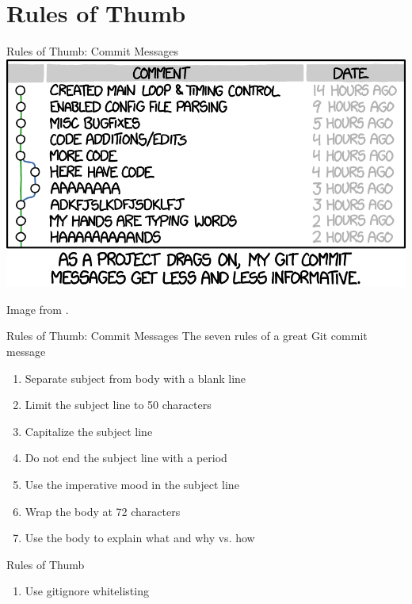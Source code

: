 \documentclass[aspectratio=169,fleqn]{beamer}
\begin{document}

\section{Rules of Thumb} %
\label{sec:rules_of_thumb}

  \begin{frame}{Rules of Thumb: Commit Messages}
    \centering
    \includegraphics[height=0.8\textheight]{images/bad-commit-messages.png}

    {\scriptsize Image from \textcite{good-commit-message}.}
  \end{frame}

  \begin{frame}{Rules of Thumb: Commit Messages}
    The seven rules of a great Git commit message
    \begin{enumerate}
      \item Separate subject from body with a blank line
      \item Limit the subject line to 50 characters
      \item Capitalize the subject line
      \item Do not end the subject line with a period
      \item Use the imperative mood in the subject line
      \item Wrap the body at 72 characters
      \item Use the body to explain what and why vs. how
    \end{enumerate}
  \end{frame}

  \begin{frame}{Rules of Thumb}
    \begin{enumerate}
      \item Use gitignore whitelisting
    \end{enumerate}
  \end{frame}
\end{document}
